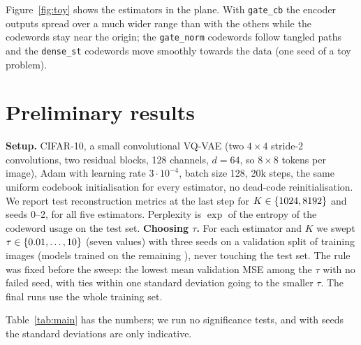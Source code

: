 \documentclass[11pt]{article}
\newcommand{\est}[1]{\texttt{#1}}
\begin{document}
Figure~\ref{fig:toy} shows the estimators in the plane. With \est{gate\_cb} the encoder outputs
spread over a much wider range than with the others while the codewords stay near the origin; the
\est{gate\_norm} codewords follow tangled paths and the \est{dense\_st} codewords move smoothly
towards the data (one seed of a toy problem).

\section{Preliminary results}
\textbf{Setup.} CIFAR-10, a small convolutional VQ-VAE (two $4\times4$ stride-2 convolutions, two
residual blocks, 128 channels, $d=64$, so $8\times8$ tokens per image), Adam with learning rate
$3\cdot10^{-4}$, batch size 128, 20k steps, the same uniform codebook initialisation for every
estimator, no dead-code reinitialisation. We report test reconstruction metrics at the last step
for $K\in\{1024,8192\}$ and seeds 0--2, for all five estimators. Perplexity is $\exp$ of the entropy of the codeword usage on the test set.
\textbf{Choosing $\tau$.} For each estimator and $K$ we swept $\tau\in\{0.01,\dots,10\}$
(seven values) with three seeds on a validation split of \resHoldout{} training images (models
trained on the remaining \resValTrain{}), never touching the test set. The rule was fixed before
the sweep: the lowest mean validation MSE among the $\tau$ with no failed seed, with ties within one
standard deviation going to the smaller $\tau$. The final runs use the whole training set.

\begin{table}[t]
\centering
\small
\resizebox{\textwidth}{!}{}
\caption{CIFAR-10 test metrics at step 20k, mean $\pm$ sample standard deviation over seeds.
$\tau$ is the multiple of the median $\lVert z-e_{k^\star}\rVert^2$ of the first batch, chosen per
estimator and $K$ on the validation split (\est{ste} and \est{ste\_ema} do not use it).
$^\dagger$Runs whose test MSE is at least $\resFailFraction$ times that of predicting the training
mean image ($\resBaselineMse\times10^{-3}$); a post-hoc descriptive criterion.}
\label{tab:main}
\end{table}

Table~\ref{tab:main} has the numbers; we run no significance tests, and with \resNSeeds{} seeds the
standard deviations are only indicative.
\end{document}
